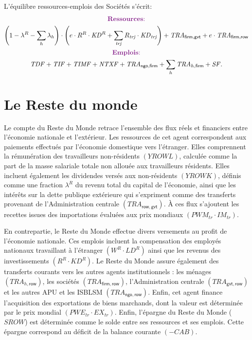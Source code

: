 \documentclass[11pt,a4paper]{article}
\newcommand{\firm}{\mathsf{firm}}
\newcommand{\gvt}{\mathsf{gvt}}
\newcommand{\ngo}{\mathsf{ngo}}
\newcommand{\row}{\mathsf{row}}
\newcommand{\tr}{\mathit{tr}}
\newcommand{\trj}{\mathit{trj}}
\newcommand{\CAB}{\mathit{CAB}}
\newcommand{\EX}{\mathit{EX}}
\newcommand{\IM}{\mathit{IM}}
\newcommand{\KD}{\mathit{KD}}
\newcommand{\LD}{\mathit{LD}}
\newcommand{\NTXF}{\mathit{NTXF}}
\newcommand{\PWE}{\mathit{PWE}}
\newcommand{\PWM}{\mathit{PWM}}
\newcommand{\SF}{\mathit{SF}}
\newcommand{\SROW}{\mathit{SROW}}
\newcommand{\TDF}{\mathit{TDF}}
\newcommand{\TIF}{\mathit{TIF}}
\newcommand{\TIMF}{\mathit{TIMF}}
\newcommand{\TRA}{\mathit{TRA}}
\newcommand{\YROWK}{\mathit{YROWK}}
\newcommand{\YROWL}{\mathit{YROWL}}
\begin{document}
	L'équilibre ressources-emplois des Sociétés s'écrit:
	\begin{gather}
		\centerline{\textcolor{Fuchsia}{\textbf{Ressources}:}} \notag\\
		\left(1 - \lambda^R-\sum_{h}\lambda_h\right)\cdot\left(e\cdot R^R\cdot\KD^R + \sum_{\trj}^{} R_{\trj}\cdot\KD_{\trj}\right)+ \TRA_{\firm,\gvt} + e\cdot\TRA_{\firm,\row} \notag\\
		\centerline{\textcolor{Fuchsia}{\textbf{Emplois}:}} \notag\\
		\TDF + \TIF + \TIMF + \NTXF + \TRA_{\ngo,\firm} + \sum_{h} \TRA_{h,\firm} + \SF.\notag
	\end{gather}
	
	
	\section{Le Reste du monde}
	Le compte du Reste du Monde retrace l'ensemble des flux réels et financiers entre l'économie nationale et l'extérieur. Les ressources de cet agent correspondent aux paiements effectués par l'économie domestique vers l'étranger. Elles comprennent la rémunération des travailleurs non-résidents $(\YROWL)$, calculée comme la part de la masse salariale totale non allouée aux travailleurs résidents. Elles incluent également les dividendes versés aux non-résidents $(\YROWK)$, définis comme une fraction $\lambda^R$ du revenu total du capital de l'économie, ainsi que les intérêts sur la dette publique extérieure qui s'expriment comme des transferts  provenant de l'Administration centrale $\left(\TRA_{\row,\gvt}\right)$. À ces flux s'ajoutent les recettes issues des importations évaluées aux prix mondiaux $\left(\PWM_{\tr} \cdot \IM_{\tr}\right)$.
	
	En contrepartie, le Reste du Monde effectue divers versements au profit de l'économie nationale. Ces emplois incluent la compensation des employés nationaux travaillant à l'étranger $\left(W^R \cdot \LD^R\right)$ ainsi que les revenus des investissements $\left(R^R \cdot \KD^R\right)$. Le Reste du Monde assure également des transferts courants vers les autres agents institutionnels : les ménages $\left(\TRA_{h,\row}\right)$, les sociétés $\left(\TRA_{\firm,\row}\right)$, l'Administration centrale $\left(\TRA_{\gvt,\row}\right)$ et les autres APU et les ISBLSM $\left(\TRA_{\ngo,\row}\right)$. Enfin, cet agent finance l'acquisition des exportations de biens marchands, dont la valeur est déterminée par le prix mondial $\left(\PWE_{\tr} \cdot \EX_{\tr}\right)$. Enfin, l'épargne du Reste du Monde ($\SROW$) est déterminée comme le solde entre ses ressources et ses emplois. Cette épargne correspond au déficit de la balance courante $(-\CAB)$.
	
\end{document}
